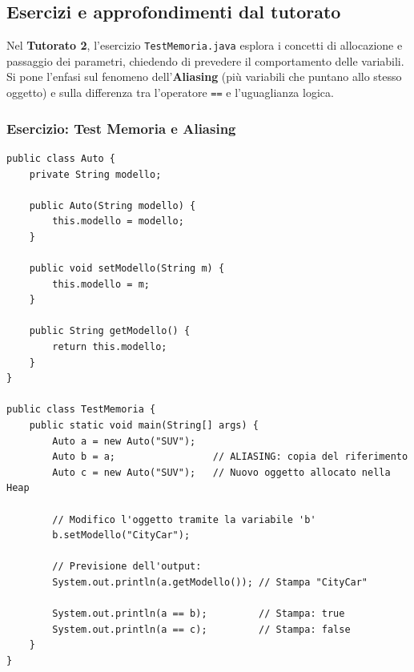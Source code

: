 \documentclass[12pt, a4paper]{article}
\begin{document}
\subsection{Esercizi e approfondimenti dal tutorato}
Nel \textbf{Tutorato 2}, l'esercizio \texttt{TestMemoria.java} esplora i concetti di allocazione e passaggio dei parametri, chiedendo di prevedere il comportamento delle variabili. Si pone l'enfasi sul fenomeno dell'\textbf{Aliasing} (più variabili che puntano allo stesso oggetto) e sulla differenza tra l'operatore \texttt{==} e l'uguaglianza logica.

\newpage

\subsubsection{Esercizio: Test Memoria e Aliasing}
\begin{verbatim}
public class Auto {
    private String modello;

    public Auto(String modello) { 
        this.modello = modello; 
    }
    
    public void setModello(String m) { 
        this.modello = m; 
    }
    
    public String getModello() { 
        return this.modello; 
    }
}

public class TestMemoria {
    public static void main(String[] args) {
        Auto a = new Auto("SUV");
        Auto b = a;                 // ALIASING: copia del riferimento
        Auto c = new Auto("SUV");   // Nuovo oggetto allocato nella Heap

        // Modifico l'oggetto tramite la variabile 'b'
        b.setModello("CityCar");

        // Previsione dell'output:
        System.out.println(a.getModello()); // Stampa "CityCar"
        
        System.out.println(a == b);         // Stampa: true
        System.out.println(a == c);         // Stampa: false
    }
}
\end{verbatim}
\end{document}
